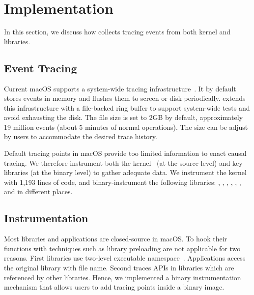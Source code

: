 \section{Implementation}\label{sec:implementation}

In this section, we discuss how \xxx collects tracing events from both kernel
and libraries.

\subsection{Event Tracing}

Current macOS supports a system-wide tracing
infrastructure~\cite{linktotracetool}. It by default stores events in memory and
flushes them to screen or disk periodically. \xxx extends this infrastructure
with a file-backed ring buffer to support system-wide tests and avoid
exhausting the disk. The file size is set to 2GB by default, approximately 19
million events (about 5 minutes of normal operations). The size can be adjust by
users to accommodate the desired trace history.

Default tracing points in macOS provide too limited information to enact causal
tracing. We therefore instrument both the kernel~\cite{linkofxnusourcecode} (at
the source level) and key libraries (at the binary level) to gather adequate
data. We instrument the kernel with 1,193 lines of code, and binary-instrument
the following libraries: , ,
, , , ,
 and  in \nlibchanges different places.


\subsection{Instrumentation}

Most libraries and applications are closed-source in macOS. To hook
their functions with techniques such as library preloading are not
applicable for two reasons. First libraries use two-level executable
namespace~\cite{twolayernamespace}. Applications access the original library
with file name. Second \xxx traces APIs in libraries which are referenced by other
libraries. Hence, we implemented a binary instrumentation mechanism that
allows users to add tracing points inside a binary image.

